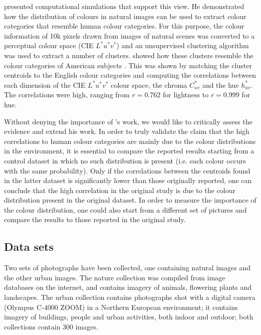 \cite{yendrikhovskij01computational} presented computational
simulations that support this view. He demonstrated how the
distribution of colours in natural images can be used to extract
colour categories that resemble human colour categories. For this
purpose, the colour information of 10k pixels drawn from images of
natural scenes was converted to a perceptual colour space (CIE
$L^*u^*v^*$) and an unsupervised clustering algorithm was used to
extract a number of
clusters. \citeauthor{yendrikhovskij01computational} showed how these
clusters resemble the colour categories of American subjects
\citep{boynton87locating}. This was shown by matching the cluster
centroids to the English colour categories and computing the
correlations between each dimension of the CIE $L^*u^*v^*$ colour
space, the chroma $C^*_{uv}$ and the hue $h^*_{uv}$. The correlations
were high, ranging from $r = 0.762$ for lightness to $r = 0.999$ for
hue.

Without denying the importance of
\citeauthor{yendrikhovskij01computational}'s work, we would like to
critically assess the evidence and extend his work. In order to truly
validate the claim that the high correlations to human colour
categories are mainly due to the colour distributions in the
environment, it is essential to compare the reported results starting
from a control dataset in which no such distribution is present
(i.e. each colour occurs with the same probability). Only if the
correlations between the centroids found in the latter dataset is
significantly lower than those originally reported, one can conclude
that the high correlation in the original study is due to the colour
distribution present in the original dataset. In order to measure the
importance of the colour distribution, one could also start from a
different set of pictures and compare the results to those reported in
the original study.

\subsection{Data sets}
\label{s:simulated-data-sets}

Two sets of photographs have been collected, one containing natural
images and the other urban images. The nature collection was compiled
from image databases on the internet, and contains imagery of animals,
flowering plants and landscapes. The urban collection contains
photographs shot with a digital camera (Olympus C-4000 ZOOM) in a
Northern European environment; it contains imagery of buildings,
people and urban activities, both indoor and outdoor; both collections
contain 300 images.

